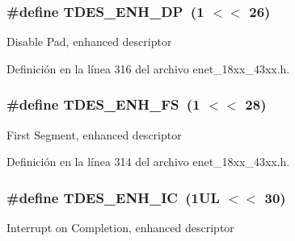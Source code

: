 \subsubsection[{\texorpdfstring{T\+D\+E\+S\+\_\+\+E\+N\+H\+\_\+\+DP}{TDES_ENH_DP}}]{\setlength{\rightskip}{0pt plus 5cm}\#define T\+D\+E\+S\+\_\+\+E\+N\+H\+\_\+\+DP~(1 $<$$<$ 26)}\hypertarget{group___e_n_e_t__18_x_x__43_x_x_gabfd3f803ecd157548b196f8f7672a4b1}{}\label{group___e_n_e_t__18_x_x__43_x_x_gabfd3f803ecd157548b196f8f7672a4b1}
Disable Pad, enhanced descriptor 

Definición en la línea 316 del archivo enet\+\_\+18xx\+\_\+43xx.\+h.

\subsubsection[{\texorpdfstring{T\+D\+E\+S\+\_\+\+E\+N\+H\+\_\+\+FS}{TDES_ENH_FS}}]{\setlength{\rightskip}{0pt plus 5cm}\#define T\+D\+E\+S\+\_\+\+E\+N\+H\+\_\+\+FS~(1 $<$$<$ 28)}\hypertarget{group___e_n_e_t__18_x_x__43_x_x_gad22d1a85908cc77388a8160bd9752ed0}{}\label{group___e_n_e_t__18_x_x__43_x_x_gad22d1a85908cc77388a8160bd9752ed0}
First Segment, enhanced descriptor 

Definición en la línea 314 del archivo enet\+\_\+18xx\+\_\+43xx.\+h.

\subsubsection[{\texorpdfstring{T\+D\+E\+S\+\_\+\+E\+N\+H\+\_\+\+IC}{TDES_ENH_IC}}]{\setlength{\rightskip}{0pt plus 5cm}\#define T\+D\+E\+S\+\_\+\+E\+N\+H\+\_\+\+IC~(1\+U\+L $<$$<$ 30)}\hypertarget{group___e_n_e_t__18_x_x__43_x_x_ga1fdd51dfc637ab04e6b28b6bb8616c34}{}\label{group___e_n_e_t__18_x_x__43_x_x_ga1fdd51dfc637ab04e6b28b6bb8616c34}
Interrupt on Completion, enhanced descriptor 

